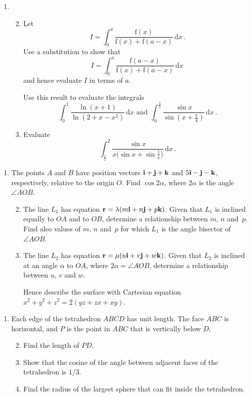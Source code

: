 \documentclass[a4, 11pt]{report}
\newlength{\qspace}
\newcounter{qnumber}
\newenvironment{question}%
 {\vspace{\qspace}
  \begin{enumerate}[\bfseries 1\quad][10]%
    \setcounter{enumi}{\value{qnumber}}%
    \item%
 }
{
  \end{enumerate}
  \filbreak
  \stepcounter{qnumber}
 }
\newenvironment{questionparts}[1][1]%
 {
  \begin{enumerate}[\bfseries (i)]%
    \setcounter{enumii}{#1}
    \addtocounter{enumii}{-1}
    \setlength{\itemsep}{5mm}
    \setlength{\parskip}{8pt}
 }
 {
  \end{enumerate}
 }
\def\d{{\mathrm d}}
\def\f{{\mathrm f}}
\begin{document}
\begin{question}
\begin{questionparts} 
\item Let  
\[
I=\int_0^a \frac {\f(x)}{\f(x)+\f(a-x)} \, \d x\,.
\]
Use a substitution to show that 
\[
I =
\int_0^a \frac {\f(a-x)}{\f(x)+\f(a-x)} \, \d x\,
\]
and hence evaluate  $I$ in terms of $a$.

Use this result to evaluate the integrals
\[
\int_0^1 \frac{\ln (x+1)}{\ln (2+x-x^2)}\, \d x
\text{ \ \ \ \ \ \ and \ \ \ \ \ }
\int_0^{\frac\pi 2} \frac{\sin x } {\sin(x+\frac \pi 4 )} \, \d x
\,.
\]
\item
Evaluate
\[
\int_{\frac12}^2 \frac {\sin x}{x \big(\sin x + \sin \frac 1 x\big)} 
\, \d x\,.
\]
\end{questionparts}
\end{question}

\begin{question}
The points $A$ and $B$ have position vectors
$\bf i +j+k$
and $5{\bf i} - {\bf j} -{\bf k}$, respectively, relative to the origin $O$.
Find $\cos2\alpha$, where $2\alpha$ is the angle $\angle AOB$.
 
\begin{questionparts}
\item The line $L   _1$ has equation 
${\bf r} =\lambda(m{\bf i}+n {\bf j} + p{\bf k})$.
Given that $L   _1$ is inclined equally to $OA$ and to $OB$,
determine a relationship between $m$, $n$ and~$p$.
Find 
also values of $m$, $n$ and~$p$ for which $L   _1$ is the 
angle bisector of $\angle AOB$.

\item   The line $L   _2$ has equation 
${\bf r} =\mu(u{\bf i}+v {\bf j} + w{\bf k})$.
Given that $  L _2$ is inclined at an angle $\alpha$ to $OA$,
where $2\alpha = \angle AOB$,  determine a relationship between
$u$, $v$ and $w$.

Hence describe the surface with Cartesian equation 
$x^2+y^2+z^2 =2(yz+zx+xy)$.
\end{questionparts}
	\end{question}
	
\begin{question}
Each edge of the tetrahedron $ABCD$ has unit length. The face
$ABC$ is horizontal, and 
$P$ is the point in  $ABC$ that is vertically below $D$.
\begin{questionparts}
\item Find the length of $PD$.
\item Show that the cosine of the angle between adjacent faces of the 
tetrahedron is
$1/3$.
\item Find the radius of the largest sphere that can fit inside
the tetrahedron.
\end{questionparts}
\end{question}
	
\end{document}

